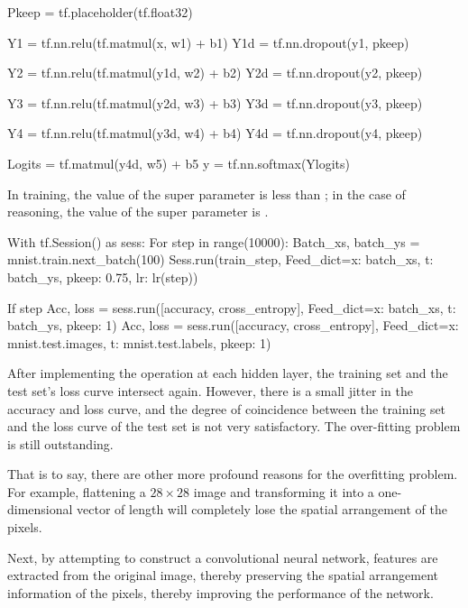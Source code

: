 \begin{content}
\begin{content}
\begin{leftbar}
\begin{python}
Pkeep = tf.placeholder(tf.float32)

Y1 = tf.nn.relu(tf.matmul(x, w1) + b1)
Y1d = tf.nn.dropout(y1, pkeep)

Y2 = tf.nn.relu(tf.matmul(y1d, w2) + b2)
Y2d = tf.nn.dropout(y2, pkeep)

Y3 = tf.nn.relu(tf.matmul(y2d, w3) + b3)
Y3d = tf.nn.dropout(y3, pkeep)

Y4 = tf.nn.relu(tf.matmul(y3d, w4) + b4)
Y4d = tf.nn.dropout(y4, pkeep)

Logits = tf.matmul(y4d, w5) + b5
y = tf.nn.softmax(Ylogits)
\end{python}
\end{leftbar}

In training, the value of the super parameter  is less than ; in the case of reasoning, the value of the super parameter  is .

\begin{leftbar}
\begin{python}
With tf.Session() as sess:
  For step in range(10000):
    Batch_xs, batch_ys = mnist.train.next_batch(100)
    Sess.run(train_step, 
      Feed_dict={x: batch_xs, t: batch_ys, pkeep: 0.75, lr: lr(step)})

    If step %
      Acc, loss = sess.run([accuracy, cross_entropy], 
        Feed_dict={x: batch_xs, t: batch_ys, pkeep: 1})
      Acc, loss = sess.run([accuracy, cross_entropy], 
        Feed_dict={x: mnist.test.images, t: mnist.test.labels, pkeep: 1})
\end{python}
\end{leftbar}

After implementing the  operation at each hidden layer, the training set and the test set's loss curve intersect again. However, there is a small jitter in the accuracy and loss curve, and the degree of coincidence between the training set and the loss curve of the test set is not very satisfactory. The over-fitting problem is still outstanding.

That is to say, there are other more profound reasons for the overfitting problem. For example, flattening a $28\times 28$ image and transforming it into a one-dimensional vector of length  will completely lose the spatial arrangement of the pixels.

Next, by attempting to construct a convolutional neural network, features are extracted from the original image, thereby preserving the spatial arrangement information of the pixels, thereby improving the performance of the network.


\end{content}
\end{content}
